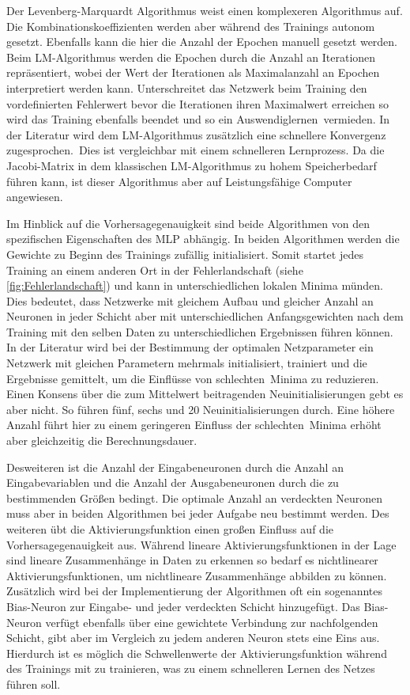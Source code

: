Der Levenberg-Marquardt Algorithmus weist einen komplexeren Algorithmus auf. Die Kombinationskoeffizienten werden aber während des Trainings autonom gesetzt. Ebenfalls kann die hier die Anzahl der Epochen manuell gesetzt werden. Beim LM-Algorithmus werden die Epochen durch die Anzahl an Iterationen repräsentiert, wobei der Wert der Iterationen als Maximalanzahl an Epochen interpretiert werden kann. Unterschreitet das Netzwerk beim Training den vordefinierten Fehlerwert bevor die Iterationen ihren Maximalwert erreichen so wird das Training ebenfalls beendet und so ein \glqq Auswendiglernen\grqq~vermieden. In der Literatur wird dem LM-Algorithmus zusätzlich eine schnellere Konvergenz zugesprochen.\, Dies ist vergleichbar mit einem schnelleren Lernprozess. Da die Jacobi-Matrix in dem klassischen LM-Algorithmus zu hohem Speicherbedarf führen kann, ist dieser Algorithmus aber auf Leistungsfähige Computer angewiesen. 

Im Hinblick auf die Vorhersagegenauigkeit sind beide Algorithmen von den spezifischen Eigenschaften des MLP abhängig. In beiden Algorithmen werden die Gewichte zu Beginn des Trainings zufällig initialisiert. Somit startet jedes Training an einem anderen Ort in der Fehlerlandschaft (siehe \autoref{fig:Fehlerlandschaft}) und kann in unterschiedlichen lokalen Minima münden. Dies bedeutet, dass Netzwerke mit gleichem Aufbau und gleicher Anzahl an Neuronen in jeder Schicht aber mit unterschiedlichen Anfangsgewichten nach dem Training mit den selben Daten zu unterschiedlichen Ergebnissen führen können. In der Literatur wird bei der Bestimmung der optimalen Netzparameter ein Netzwerk mit gleichen Parametern mehrmals initialisiert, trainiert und die Ergebnisse gemittelt, um die Einflüsse von \glqq schlechten\grqq~Minima zu reduzieren. Einen Konsens über die zum Mittelwert beitragenden Neuinitialisierungen gebt es aber nicht. So führen \citet{Domanski2017} fünf, \citet{Keles2016} sechs und \citet{Monteiro2016} 20 Neuinitialisierungen durch. Eine höhere Anzahl führt hier zu einem geringeren Einfluss der \glqq schlechten\grqq~Minima erhöht aber gleichzeitig die Berechnungsdauer.

Desweiteren ist die Anzahl der Eingabeneuronen durch die Anzahl an Eingabevariablen und die Anzahl der Ausgabeneuronen durch die zu bestimmenden Größen bedingt. Die optimale Anzahl an verdeckten Neuronen muss aber in beiden Algorithmen bei jeder Aufgabe neu bestimmt werden. Des weiteren übt die Aktivierungsfunktion einen großen Einfluss auf die Vorhersagegenauigkeit aus. Während lineare Aktivierungsfunktionen in der Lage sind lineare Zusammenhänge in Daten zu erkennen so bedarf es nichtlinearer Aktivierungsfunktionen, um nichtlineare Zusammenhänge abbilden zu können.\, Zusätzlich wird bei der Implementierung der Algorithmen oft ein sogenanntes Bias-Neuron zur Eingabe- und jeder verdeckten Schicht hinzugefügt. Das Bias-Neuron verfügt ebenfalls über eine gewichtete Verbindung zur nachfolgenden Schicht, gibt aber im Vergleich zu jedem anderen Neuron stets eine Eins aus. Hierdurch ist es möglich die Schwellenwerte der Aktivierungsfunktion während des Trainings mit zu trainieren, was zu einem schnelleren Lernen des Netzes führen soll.\,